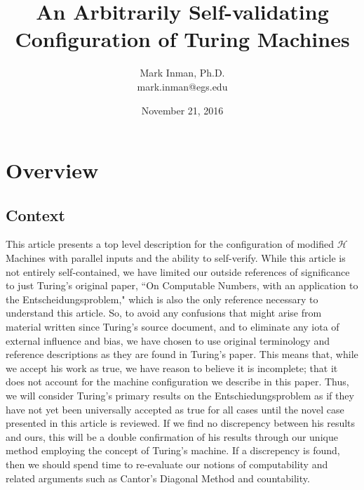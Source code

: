 \documentclass[11pt]{article}
\title{An Arbitrarily Self-validating Configuration of Turing Machines}
\author{Mark Inman, Ph.D. \\ mark.inman@egs.edu}
\date{November 21, 2016}
\begin{document}
\maketitle
{}
\section{Overview}
\subsection{Context}
This article presents a top level description for the configuration of modified $\mathscr{H}$ Machines with parallel inputs and the ability to self-verify. While this article is not entirely self-contained, we have limited our outside references of significance to just Turing's original paper, ``On Computable Numbers, with an application to the Entscheidungsproblem," which is also the only reference necessary to understand this article. %
So, to avoid any confusions that might arise from material written since Turing's source document, and to eliminate any iota of external influence and bias, we have chosen to use original terminology and reference descriptions as they are found in Turing's paper. This means that, while we accept his work as true, we have reason to believe it is incomplete; that it does not account for the machine configuration we describe in this paper. Thus, we will consider Turing's primary results on the Entschiedungsproblem as if they have not yet been universally accepted as true for all cases until the novel case presented in this article is reviewed. If we find no discrepency between his results and ours, this will be a double confirmation of his results through our unique method employing the concept of Turing's machine. If a discrepency is found, then we should spend time to re-evaluate our notions of computability and related arguments such as Cantor's Diagonal Method and countability.
\end{document}
